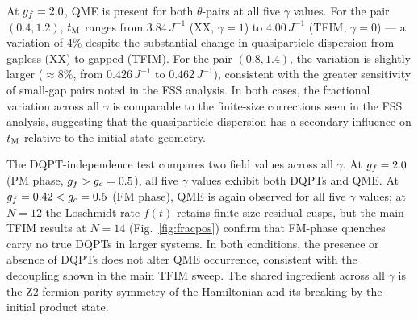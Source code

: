 At $g_f = 2.0$, QME is present for both $\theta$-pairs at all five $\gamma$ values.
For the pair $(0.4, 1.2)$, $t_{\rm M}$ ranges from $3.84\,J^{-1}$ (XX, $\gamma=1$) to
$4.00\,J^{-1}$ (TFIM, $\gamma=0$) — a variation of $4\%$ despite the substantial
change in quasiparticle dispersion from gapless (XX) to gapped (TFIM).
For the pair $(0.8, 1.4)$, the variation is slightly larger ($\approx 8\%$,
from $0.426\,J^{-1}$ to $0.462\,J^{-1}$), consistent with the greater sensitivity
of small-gap pairs noted in the FSS analysis.
In both cases, the fractional variation across all $\gamma$ is comparable to the
finite-size corrections seen in the FSS analysis, suggesting that the quasiparticle
dispersion has a secondary influence on $t_{\rm M}$ relative to the initial state geometry.

The DQPT-independence test compares two field values across all $\gamma$.
At $g_f = 2.0$ (PM phase, $g_f > g_c = 0.5$), all five $\gamma$ values exhibit
both DQPTs and QME.
At $g_f = 0.42 < g_c = 0.5$ (FM phase), QME is again observed for all five $\gamma$
values; at $N=12$ the Loschmidt rate $f(t)$ retains finite-size residual cusps,
but the main TFIM results at $N=14$ (Fig.~\ref{fig:fracpos}) confirm that
FM-phase quenches carry no true DQPTs in larger systems.
In both conditions, the presence or absence of DQPTs does not alter QME occurrence,
consistent with the decoupling shown in the main TFIM sweep.
The shared ingredient across all $\gamma$ is the Z2 fermion-parity symmetry of the
Hamiltonian and its breaking by the initial product state.
